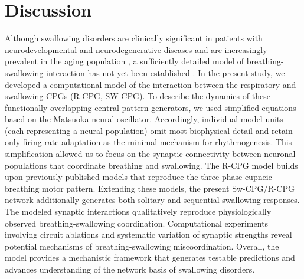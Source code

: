 \documentclass[pdflatex,sn-mathphys-ay]{sn-jnl}%
\theoremstyle{thmstyleone}%
\theoremstyle{thmstyletwo}%
\theoremstyle{thmstylethree}%
\begin{document}
\section{Discussion}\label{Discussion}
Although swallowing disorders are clinically significant in patients with neurodevelopmental and neurodegenerative diseases and are increasingly prevalent in the aging population \citep{maynard2020suckling, sullivan2008gastrointestinal, gross2008coordination, seccil2016dysphagia, easterling2008dementia, pitts2008voluntary, finiels2001deglutition, pitts2023deglutition, niederman2022aspiration}, a sufficiently detailed model of breathing-swallowing interaction has not yet been established \citep{horton2018central}.
In the present study, we developed a computational model of the interaction between the respiratory and swallowing CPGs (R-CPG, SW-CPG). To describe the dynamics of these functionally overlapping central pattern generators, we used simplified equations based on the Matsuoka neural oscillator. Accordingly, individual model units (each representing a neural population) omit most biophysical detail and retain only firing rate adaptation as the minimal mechanism for rhythmogenesis. This simplification allowed us to focus on the synaptic connectivity between neuronal populations that coordinate breathing and swallowing.
The R-CPG model builds upon previously published models \citep{rybak2004modeling, smith2007spatial, molkov2013control, molkov2017computational} that reproduce the three-phase eupneic breathing motor pattern. Extending these models, the present Sw-CPG/R-CPG network additionally generates both solitary and sequential swallowing responses. The modeled synaptic interactions qualitatively reproduce physiologically observed breathing-swallowing coordination. Computational experiments involving circuit ablations and systematic variation of synaptic strengths reveal potential mechanisms of breathing-swallowing miscoordination. Overall, the model provides a mechanistic framework that generates testable predictions and advances understanding of the network basis of swallowing disorders.
\end{document}
